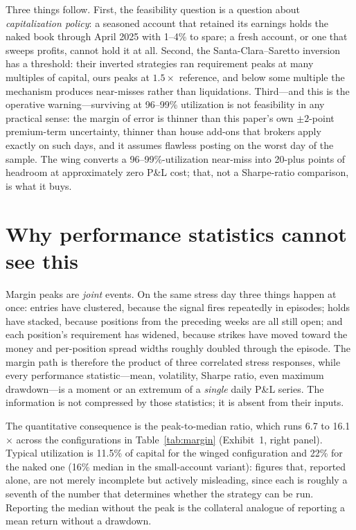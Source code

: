 \documentclass[11pt]{article}
\begin{document}
Three things follow. First, the feasibility question is a question about \emph{capitalization
policy}: a seasoned account that retained its earnings holds the naked book through April 2025
with 1--4\% to spare; a fresh account, or one that sweeps profits, cannot hold it at all.
Second, the Santa-Clara--Saretto inversion has a threshold: their inverted strategies ran
requirement peaks at many multiples of capital, ours peaks at $1.5\times$ reference, and below
some multiple the mechanism produces near-misses rather than liquidations. Third---and this is
the operative warning---surviving at 96--99\% utilization is not feasibility in any practical
sense: the margin of error is thinner than this paper's own $\pm 2$-point premium-term
uncertainty, thinner than house add-ons that brokers apply exactly on such days, and it
assumes flawless posting on the worst day of the sample. The wing converts a 96--99\%-utilization
near-miss into 20-plus points of headroom at approximately zero P\&L cost; that, not a
Sharpe-ratio comparison, is what it buys.

\section{Why performance statistics cannot see this}\label{sec:why}
Margin peaks are \emph{joint} events. On the same stress day three things happen at once:
entries have clustered, because the signal fires repeatedly in episodes; holds have stacked,
because positions from the preceding weeks are all still open; and each position's requirement
has widened, because strikes have moved toward the money and per-position spread widths roughly
doubled through the episode. The margin path is therefore the product of three correlated
stress responses, while every performance statistic---mean, volatility, Sharpe ratio, even
maximum drawdown---is a moment or an extremum of a \emph{single} daily P\&L series. The
information is not compressed by those statistics; it is absent from their inputs.

The quantitative consequence is the peak-to-median ratio, which runs 6.7 to 16.1$\times$ across
the configurations in Table~\ref{tab:margin} (Exhibit~1, right panel). Typical utilization is
11.5\% of capital for the winged configuration and 22\% for the naked one (16\% median in the
small-account variant): figures that, reported alone, are not merely incomplete but actively
misleading, since each is roughly a seventh of the number that determines
whether the strategy can be run. Reporting the median without the peak is the collateral analogue of
reporting a mean return without a drawdown.
\end{document}
